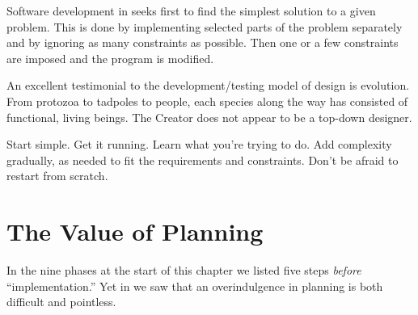 \begin{tfquot}
Software development in \Forth{} seeks first to find the simplest
solution to a given problem. This is done by implementing selected
parts of the problem separately and by ignoring as many constraints as
possible. Then one or a few constraints are imposed and the program is
modified.
\end{tfquot}
An excellent testimonial to the development/testing model of design is
evolution. From protozoa to tadpoles to people, each species along the
way has consisted of functional, living beings. The Creator does not
appear to be a top-down designer.

\begin{tip}
Start simple. Get it running. Learn what you're trying to do. Add
complexity gradually, as needed to fit the requirements and
constraints. Don't be afraid to restart from scratch.
\end{tip}%
%

\section{The Value of Planning}%
%

In the nine phases at the start of this chapter we listed five steps
\emph{before} ``implementation.'' Yet in  we saw that an
overindulgence in planning is both difficult and pointless.

